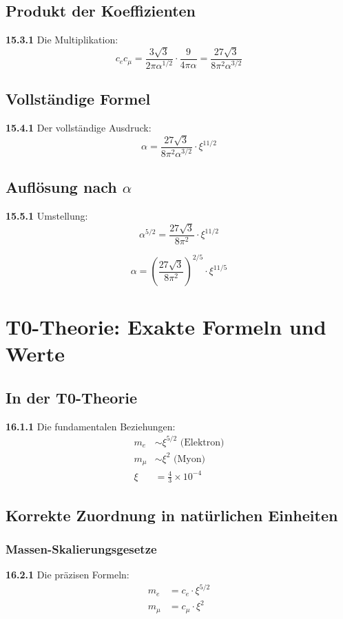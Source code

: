 \documentclass[12pt,a4paper]{article}
\newcommand{\xipar}{\xi}
\begin{document}
\subsection{Produkt der Koeffizienten}

\noindent \textbf{15.3.1} Die Multiplikation:
\[
c_e c_\mu = \frac{3\sqrt{3}}{2\pi\alpha^{1/2}} \cdot \frac{9}{4\pi\alpha} = \frac{27\sqrt{3}}{8\pi^2\alpha^{3/2}}
\]

\subsection{Vollständige Formel}

\noindent \textbf{15.4.1} Der vollständige Ausdruck:
\[
\alpha = \frac{27\sqrt{3}}{8\pi^2\alpha^{3/2}} \cdot \xi^{11/2}
\]

\subsection{Auflösung nach $\alpha$}

\noindent \textbf{15.5.1} Umstellung:
\[
\alpha^{5/2} = \frac{27\sqrt{3}}{8\pi^2} \cdot \xi^{11/2}
\]

\[
\alpha = \left(\frac{27\sqrt{3}}{8\pi^2}\right)^{2/5} \cdot \xi^{11/5}
\]


\section{T0-Theorie: Exakte Formeln und Werte}

\subsection{In der T0-Theorie}

\noindent \textbf{16.1.1} Die fundamentalen Beziehungen:
\begin{align}
	m_e &\sim \xi^{5/2} \text{ (Elektron)} \\
	m_\mu &\sim \xi^2 \text{ (Myon)} \\
	\xi &= \frac{4}{3} \times 10^{-4} 
\end{align}

\subsection{Korrekte Zuordnung in natürlichen Einheiten}

\subsubsection{Massen-Skalierungsgesetze}
\noindent \textbf{16.2.1} Die präzisen Formeln:
\begin{align}
	m_e &= c_e \cdot \xipar^{5/2} \\
	m_\mu &= c_\mu \cdot \xipar^2
\end{align}
\end{document}
